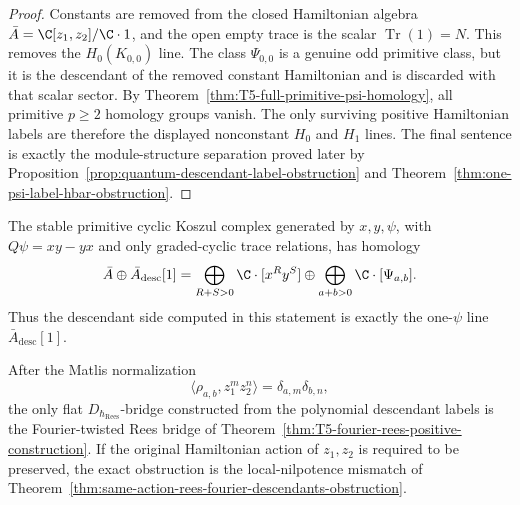 \begin{proof}
  Constants are removed from the closed Hamiltonian algebra
  \(\bar A=\C[z_1,z_2]/\C\cdot1\), and the open empty trace is the scalar
  \(\operatorname{Tr}(1)=N\).  This removes the \(H_0(K_{0,0})\) line.
  The class \(\Psi_{0,0}\) is a genuine odd primitive class, but it is the
  descendant of the removed constant Hamiltonian and is discarded with
  that scalar sector.  By
  Theorem~\ref{thm:T5-full-primitive-psi-homology}, all primitive
  \(p\ge2\) homology groups vanish.  The only surviving positive
  Hamiltonian labels are therefore the displayed nonconstant \(H_0\) and
  \(H_1\) lines.  The final sentence is exactly the module-structure
  separation proved later by
  Proposition~\ref{prop:quantum-descendant-label-obstruction} and
  Theorem~\ref{thm:one-psi-label-hbar-obstruction}.
\end{proof}

\begin{thm}
  \label{thm:T5-universal-primitive-descendant-envelope}
  The stable primitive cyclic Koszul complex generated by
  \(x,y,\psi\), with \(Q\psi=xy-yx\) and only graded-cyclic trace
  relations, has homology
  \[
    \bar A\oplus\bar A_{\mathrm{desc}}[1]
    =
    \bigoplus_{R+S>0}\C\cdot[x^Ry^S]
      \oplus
    \bigoplus_{a+b>0}\C\cdot[\Psi_{a,b}].
  \]
  Thus the descendant side computed in this statement is exactly the
  one-\(\psi\) line \(\bar A_{\mathrm{desc}}[1]\).

  After the Matlis normalization
  \[
    \langle\rho_{a,b},z_1^m z_2^n\rangle
      =\delta_{a,m}\delta_{b,n},
  \]
  the only flat \(D_{\hbar_{\mathrm{Rees}}}\)-bridge constructed from the polynomial
  descendant labels is the Fourier-twisted Rees bridge of
  Theorem~\ref{thm:T5-fourier-rees-positive-construction}.  If the original
  Hamiltonian action of \(z_1,z_2\) is required to be preserved, the exact
  obstruction is the local-nilpotence mismatch of
  Theorem~\ref{thm:same-action-rees-fourier-descendants-obstruction}.
\end{thm}


